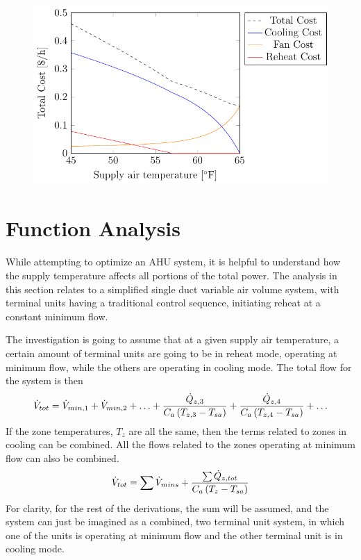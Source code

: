 \begin{figure}
\centering
\includegraphics{Plots/36-SimplifiedExampleCostLowerMAT/simplifiedExampleCostLowMAT.pdf}
\caption{}
\label{fig:simplifiedExampleCostLowerMAT}
\end{figure}


\section{Function Analysis}

While attempting to optimize an AHU system, it is helpful to understand
how the supply temperature affects all portions of the total power. The
analysis in this section relates to a simplified single duct variable
air volume system, with terminal units having a traditional control
sequence, initiating reheat at a constant minimum flow. 

The investigation is going to assume that at a given supply air
temperature, a certain amount of terminal units are going to be in
reheat mode, operating at minimum flow, while the others are operating
in cooling mode. The total flow for the system is then 
%
\begin{equation}
    \dot{V}_{tot} = \dot{V}_{min,1} + \dot{V}_{min,2} + \ldots +
    \frac{\dot{Q}_{z,3}}{C_{a} \left(T_{z,3} - T_{sa}{}\right) } +
    \frac{\dot{Q}_{z,4}}{C_{a} \left(T_{z,4} - T_{sa}{}\right) } +
    \ldots
\end{equation}
%
If the zone temperatures, \(T_{z}\) are all the same, then the terms
related to zones in cooling can be combined. All the flows related to
the zones operating at minimum flow can also be combined.
\begin{equation}
    \dot{V}_{tot} = \sum \dot{V}_{mins} + \frac{\sum \dot{Q}_{z,tot}}{C_{a}
    \left(T_{z} - T_{sa}{}\right) } 
\end{equation}
%
For clarity, for the rest of the derivations, the sum will be assumed,
and the system can just be imagined as a combined, two terminal unit
system, in which one of the units is operating at minimum flow and the
other terminal unit is in cooling mode. 

